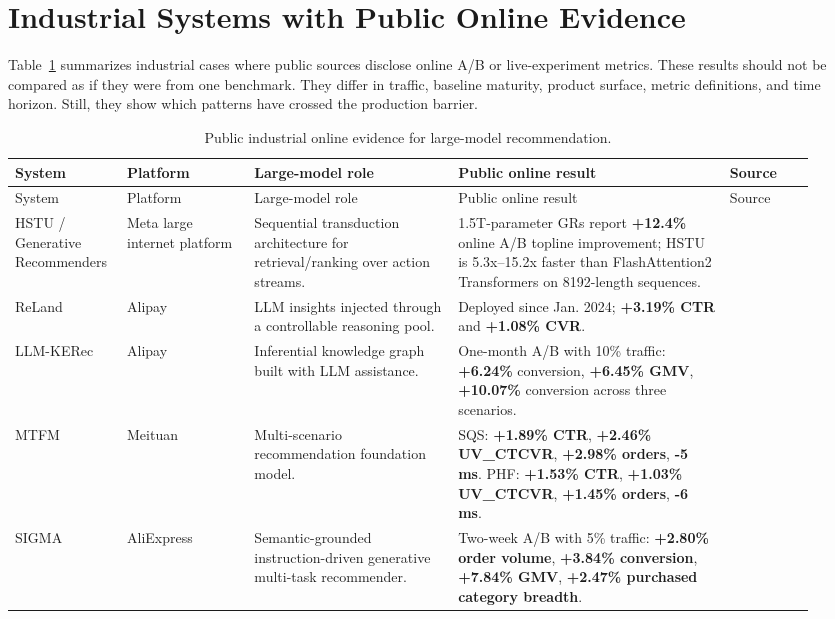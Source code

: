 \documentclass[11pt]{article}
\newcommand{\metric}[1]{\textbf{#1}}
\begin{document}
\section{Industrial Systems with Public Online Evidence}

Table~\ref{tab:ab} summarizes industrial cases where public sources disclose online A/B or live-experiment metrics. These results should not be compared as if they were from one benchmark. They differ in traffic, baseline maturity, product surface, metric definitions, and time horizon. Still, they show which patterns have crossed the production barrier.

\small
\begin{longtable}{@{}p{0.12\linewidth}p{0.15\linewidth}p{0.24\linewidth}p{0.32\linewidth}p{0.10\linewidth}@{}}
\caption{Public industrial online evidence for large-model recommendation.}
\label{tab:ab}\\
\toprule
System & Platform & Large-model role & Public online result & Source\\
\midrule
\endfirsthead
\toprule
System & Platform & Large-model role & Public online result & Source\\
\midrule
\endhead
HSTU / Generative Recommenders & Meta large internet platform & Sequential transduction architecture for retrieval/ranking over action streams. & 1.5T-parameter GRs report \metric{+12.4\%} online A/B topline improvement; HSTU is 5.3x--15.2x faster than FlashAttention2 Transformers on 8192-length sequences. & \cite{hstu}\\
ReLand & Alipay & LLM insights injected through a controllable reasoning pool. & Deployed since Jan. 2024; \metric{+3.19\% CTR} and \metric{+1.08\% CVR}. & \cite{reland}\\
LLM-KERec & Alipay & Inferential knowledge graph built with LLM assistance. & One-month A/B with 10\% traffic: \metric{+6.24\%} conversion, \metric{+6.45\% GMV}, \metric{+10.07\%} conversion across three scenarios. & \cite{llmkerec}\\
MTFM & Meituan & Multi-scenario recommendation foundation model. & SQS: \metric{+1.89\% CTR}, \metric{+2.46\% UV\_CTCVR}, \metric{+2.98\% orders}, \metric{-5 ms}. PHF: \metric{+1.53\% CTR}, \metric{+1.03\% UV\_CTCVR}, \metric{+1.45\% orders}, \metric{-6 ms}. & \cite{mtfm}\\
SIGMA & AliExpress & Semantic-grounded instruction-driven generative multi-task recommender. & Two-week A/B with 5\% traffic: \metric{+2.80\% order volume}, \metric{+3.84\% conversion}, \metric{+7.84\% GMV}, \metric{+2.47\% purchased category breadth}. & \cite{sigma}\\

\end{longtable}
\end{document}
